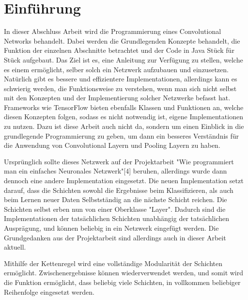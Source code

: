\documentclass[12pt]{article}
\begin{document}
\cleardoublepage
\thispagestyle{empty}
\tableofcontents
\thispagestyle{empty}
\cleardoublepage
\setcounter{page}{1}

\section{Einführung}
In dieser Abschluss Arbeit wird die Programmierung eines Convolutional Networks  behandelt. Dabei werden die Grundlegenden Konzepte behandelt, die Funktion der einzelnen Abschnitte betrachtet und der Code in Java Stück für Stück aufgebaut. Das Ziel ist es, eine Anleitung zur Verfügung zu stellen, welche es einem ermöglicht, selber solch ein Netzwerk aufzubauen und einzusetzen. Natürlich gibt es bessere und effizientere Implementationen, allerdings kann es schwierig werden, die Funktionsweise zu verstehen, wenn man sich nicht selbst mit den Konzepten und der Implementierung solcher Netzwerke befasst hat. Frameworks wie TensorFlow bieten ebenfalls Klassen und Funktionen an, welche diesen Konzepten folgen, sodass es nicht notwendig ist, eigene Implementationen zu nutzen. Dazu ist diese Arbeit auch nicht da, sondern um einen Einblick in die grundlegende Programmierung zu geben, um dann ein besseres Verständnis für die Anwendung von Convolutional Layern und Pooling Layern zu haben.

Ursprünglich sollte dieses Netzwerk auf der Projektarbeit "Wie programmiert man ein einfaches Neuronales Netzwerk"[4] beruhen, allerdings wurde dann dennoch eine andere Implementation eingesetzt. Die neuen Implementation setzt darauf, dass die Schichten sowohl die Ergebnisse beim Klassifizieren, als auch beim Lernen neuer Daten Selbstständig an die nächste Schicht reichen. Die Schichten selbst erben nun von einer Oberklasse "Layer". Dadurch sind die Implementationen der tatsächlichen Schichten unabhängig der tatsächlichen Ausprägung, und können beliebig in ein Netzwerk eingefügt werden. Die Grundgedanken aus der Projektarbeit sind allerdings auch in dieser Arbeit aktuell.

Mithilfe der Kettenregel wird eine vollständige Modularität der Schichten ermöglicht. Zwischenergebnisse können wiederverwendet werden, und somit wird die Funktion ermöglicht, dass beliebig viele Schichten, in vollkommen beliebiger Reihenfolge eingesetzt werden. 
\end{document}
